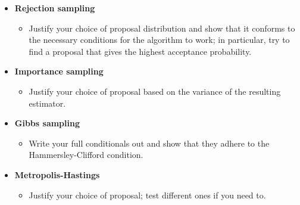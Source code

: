 \documentclass[a4paper,10pt, notitlepage]{report}
\begin{document}
\begin{itemize}
 \item \textbf{Rejection sampling}
  \begin{itemize}
  \item Justify your choice of proposal distribution and show that it conforms to the necessary conditions for the algorithm to work; in particular, try to find a proposal that gives the highest acceptance probability.
 \end{itemize}
  \item \textbf{Importance sampling}
 \begin{itemize}
  \item Justify your choice of proposal based on the variance of the resulting estimator.
 \end{itemize}
  \item \textbf{Gibbs sampling}
 \begin{itemize}
  \item Write your full conditionals out and show that they adhere to the Hammersley-Clifford condition.
 \end{itemize}
  \item \textbf{Metropolis-Hastings}
 \begin{itemize}
  \item Justify your choice of proposal; test different ones if you need to.
 \end{itemize}
\end{itemize}
% 
% 
% 
\end{document}
